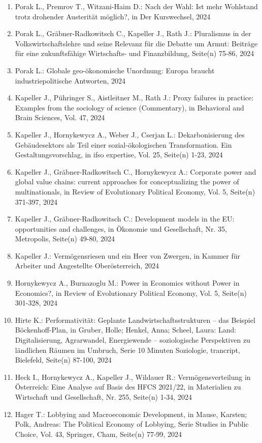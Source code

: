 \begin{enumerate}
	 \item Porak L., Premrov T., Witzani-Haim D.: Nach der Wahl: Ist mehr Wohl­stand trotz dro­hen­der Aus­teri­tät möglich?, in Der Kurswechsel, 2024
	 \item Porak L., Gräbner-Radkowitsch C., Kapeller J., Rath J.: Pluralismus in der Volkswirtschaftslehre und seine Relevanz für die Debatte um Armut: Beiträge für eine zukunftsfähige Wirtschafts- und Finanzbildung, Seite(n) 75-86, 2024
	 \item Porak L.: Globale geo-ökonomische Unordnung: Europa braucht industriepolitische Antworten, 2024
	 \item Kapeller J., Pühringer S., Aistleitner M., Rath J.: Proxy failures in practice: Examples from the sociology of science (Commentary), in Behavioral and Brain Sciences, Vol. 47, 2024
	 \item Kapeller J., Hornykewycz A., Weber J., Cserjan L.: Dekarbonisierung des Gebäudesektors als Teil einer sozial-ökologischen Transformation. Ein Gestaltungsvorschlag, in ifso expertise, Vol. 25, Seite(n) 1-23, 2024
	 \item Kapeller J., Gräbner-Radkowitsch C., Hornykewycz A.: Corporate power and global value chains: current approaches for conceptualizing the power of multinationals, in Review of Evolutionary Political Economy, Vol. 5, Seite(n) 371-397, 2024
	 \item Kapeller J., Gräbner-Radkowitsch C.: Development models in the EU:  opportunities and challenges, in Ökonomie und Gesellschaft, Nr. 35, Metropolis, Seite(n) 49-80, 2024
	 \item Kapeller J.: Vermögensriesen und ein Heer von Zwergen, in Kammer für Arbeiter und Angestellte Oberösterreich, 2024
	 \item Hornykewycz A., Burnazoglu M.: Power in Economics without Power in Economics?, in Review of Evolutionary Political Economy, Vol. 5, Seite(n) 301-328, 2024
	 \item Hirte K.: Performativität: Geplante Landwirtschaftsstrukturen – das Beispiel Böckenhoff-Plan, in Gruber, Holle; Henkel, Anna; Scheel, Laura: Land: Digitalisierung, Agrarwandel, Energiewende – soziologische Perspektiven zu ländlichen Räumen im Umbruch, Serie 10 Minuten Soziologie, trancript, Bielefeld, Seite(n) 87-100, 2024
	 \item Heck I., Hornykewycz A., Kapeller J., Wildauer R.: Vermögensverteilung  in Österreich: Eine Analyse auf Basis des HFCS 2021/22, in Materialien zu Wirtschaft und Gesellschaft, Nr. 255, Seite(n) 1-34, 2024
	 \item Hager T.: Lobbying and Macroeconomic Development, in Mause, Karsten; Polk, Andreas: The Political Economy of Lobbying, Serie Studies in Public Choice, Vol. 43, Springer, Cham, Seite(n) 77-99, 2024

\end{enumerate}
